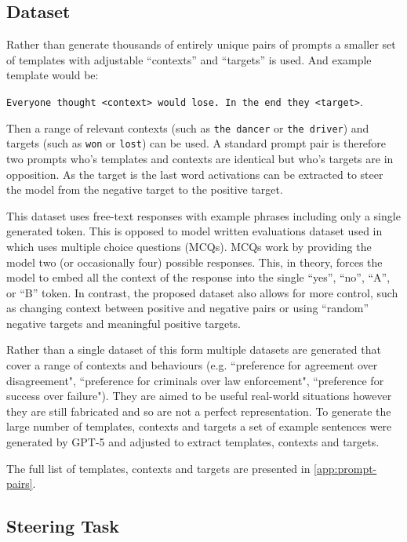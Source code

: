 \subsection{Dataset}

Rather than generate thousands of entirely unique pairs of prompts a smaller set of templates with adjustable ``contexts'' and ``targets'' is used.
And example template would be:

\texttt{Everyone thought <context> would lose. In the end they <target>}.

Then a range of relevant contexts (such as \texttt{the dancer} or \texttt{the driver}) and targets (such as \texttt{won} or \texttt{lost}) can be used.
A standard prompt pair is therefore two prompts who's templates and contexts are identical but who's targets are in opposition.
As the target is the last word activations can be extracted to steer the model from the negative target to the positive target.

This dataset uses free-text responses with example phrases including only a single generated token.
This is opposed to model written evaluations \citep{mwe} dataset used in \citet{steerability} which uses multiple choice questions (MCQs).
MCQs work by providing the model two (or occasionally four) possible responses.
This, in theory, forces the model to embed all the context of the response into the single ``yes'', ``no'', ``A'', or ``B'' token.
In contrast, the proposed dataset also allows for more control, such as changing context between positive and negative pairs or using ``random'' negative targets and meaningful positive targets.

Rather than a single dataset of this form multiple datasets are generated that cover a range of contexts and behaviours (e.g. ``preference for agreement over disagreement", ``preference for criminals over law enforcement", ``preference for success over failure").
They are aimed to be useful real-world situations however they are still fabricated and so are not a perfect representation.
To generate the large number of templates, contexts and targets a set of example sentences were generated by GPT-5 \citep{gpt-5} and adjusted to extract templates, contexts and targets.

The full list of templates, contexts and targets are presented in \cref{app:prompt-pairs}.

\subsection{Steering Task}

